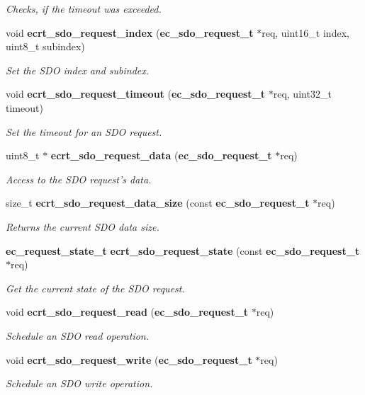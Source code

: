 \begin{DoxyCompactItemize}
\begin{DoxyCompactList}\small\item\em \-Checks, if the timeout was exceeded. \end{DoxyCompactList}\item 
void {\bf ecrt\-\_\-sdo\-\_\-request\-\_\-index} ({\bf ec\-\_\-sdo\-\_\-request\-\_\-t} $\ast$req, uint16\-\_\-t index, uint8\-\_\-t subindex)
\begin{DoxyCompactList}\small\item\em \-Set the \-S\-D\-O index and subindex. \end{DoxyCompactList}\item 
void {\bf ecrt\-\_\-sdo\-\_\-request\-\_\-timeout} ({\bf ec\-\_\-sdo\-\_\-request\-\_\-t} $\ast$req, uint32\-\_\-t timeout)
\begin{DoxyCompactList}\small\item\em \-Set the timeout for an \-S\-D\-O request. \end{DoxyCompactList}\item 
uint8\-\_\-t $\ast$ {\bf ecrt\-\_\-sdo\-\_\-request\-\_\-data} ({\bf ec\-\_\-sdo\-\_\-request\-\_\-t} $\ast$req)
\begin{DoxyCompactList}\small\item\em \-Access to the \-S\-D\-O request's data. \end{DoxyCompactList}\item 
size\-\_\-t {\bf ecrt\-\_\-sdo\-\_\-request\-\_\-data\-\_\-size} (const {\bf ec\-\_\-sdo\-\_\-request\-\_\-t} $\ast$req)
\begin{DoxyCompactList}\small\item\em \-Returns the current \-S\-D\-O data size. \end{DoxyCompactList}\item 
{\bf ec\-\_\-request\-\_\-state\-\_\-t} {\bf ecrt\-\_\-sdo\-\_\-request\-\_\-state} (const {\bf ec\-\_\-sdo\-\_\-request\-\_\-t} $\ast$req)
\begin{DoxyCompactList}\small\item\em \-Get the current state of the \-S\-D\-O request. \end{DoxyCompactList}\item 
void {\bf ecrt\-\_\-sdo\-\_\-request\-\_\-read} ({\bf ec\-\_\-sdo\-\_\-request\-\_\-t} $\ast$req)
\begin{DoxyCompactList}\small\item\em \-Schedule an \-S\-D\-O read operation. \end{DoxyCompactList}\item 
void {\bf ecrt\-\_\-sdo\-\_\-request\-\_\-write} ({\bf ec\-\_\-sdo\-\_\-request\-\_\-t} $\ast$req)
\begin{DoxyCompactList}\small\item\em \-Schedule an \-S\-D\-O write operation. \end{DoxyCompactList}\end{DoxyCompactItemize}


